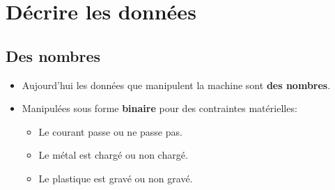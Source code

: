 \section[Décrire]{Décrire les données}
\subsection{Des nombres}

\begin{slide}
	\begin{itemize}
		\item Aujourd'hui les données que manipulent la machine sont \textbf{des nombres}.
		\item Manipulées sous forme \textbf{binaire} pour des contraintes matérielles:
			\begin{itemize}
				\item Le courant passe ou ne passe pas.
				\item Le métal est chargé ou non chargé.
				\item Le plastique est gravé ou non gravé.
			\end{itemize}  
	\end{itemize}
\end{slide}

